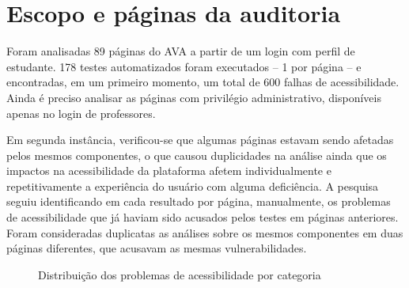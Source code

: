 \documentclass[
	12pt,				%
	openright,			%
	oneside,			%
	a4paper,			%
	chapter=TITLE,		%
	section=TITLE,		%
	subsection=TITLE,	%
	subsubsection=TITLE,%
	english,			%
	brazil				%
	]{abntex2}
\theoremstyle{definition}
\begin{document}
\section{Escopo e páginas da auditoria}

Foram analisadas 89 páginas do AVA a partir de um login com perfil de estudante. 178 testes automatizados foram executados – 1 por página – e encontradas, em um primeiro momento, um total de 600 falhas de acessibilidade. Ainda é preciso analisar as páginas com privilégio administrativo, disponíveis apenas no login de professores.

Em segunda instância, verificou-se que algumas páginas estavam sendo afetadas pelos mesmos componentes, o que causou duplicidades na análise ainda que os impactos na acessibilidade da plataforma afetem individualmente e repetitivamente a experiência do usuário com alguma deficiência. A pesquisa seguiu identificando em cada resultado por página, manualmente, os problemas de acessibilidade que já haviam sido acusados pelos testes em páginas anteriores. Foram consideradas duplicatas as análises sobre os mesmos componentes em duas páginas diferentes, que acusavam as mesmas vulnerabilidades.



\begin{figure}[!h]
\centering
\caption{Distribuição dos problemas de acessibilidade por categoria}
\label{Distribuição dos problemas de acessibilidade por categoria}
\end{figure}
\end{document}
